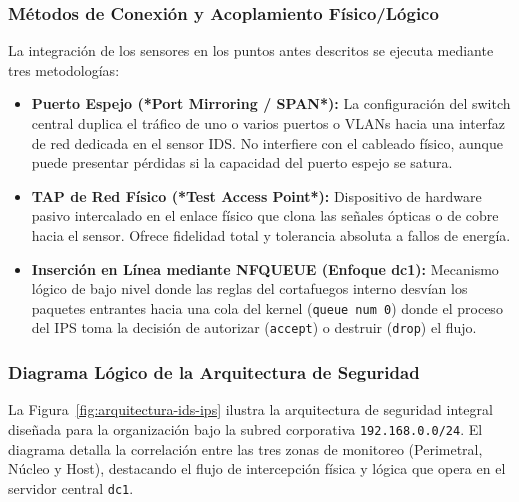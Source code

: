 \subsubsection{Métodos de Conexión y Acoplamiento Físico/Lógico}

La integración de los sensores en los puntos antes descritos se ejecuta mediante tres metodologías:

\begin{itemize}
  \item \textbf{Puerto Espejo (*Port Mirroring / SPAN*):} La configuración del switch central duplica el tráfico de uno o varios puertos o VLANs hacia una interfaz de red dedicada en el sensor IDS. No interfiere con el cableado físico, aunque puede presentar pérdidas si la capacidad del puerto espejo se satura.
  \item \textbf{TAP de Red Físico (*Test Access Point*):} Dispositivo de hardware pasivo intercalado en el enlace físico que clona las señales ópticas o de cobre hacia el sensor. Ofrece fidelidad total y tolerancia absoluta a fallos de energía.
  \item \textbf{Inserción en Línea mediante NFQUEUE (Enfoque dc1):} Mecanismo lógico de bajo nivel donde las reglas del cortafuegos interno desvían los paquetes entrantes hacia una cola del kernel (\texttt{queue num 0}) donde el proceso del IPS toma la decisión de autorizar (\texttt{accept}) o destruir (\texttt{drop}) el flujo.
\end{itemize}

\subsubsection{Diagrama Lógico de la Arquitectura de Seguridad}

La Figura~\ref{fig:arquitectura-ids-ips} ilustra la arquitectura de seguridad integral diseñada para la organización bajo la subred corporativa \texttt{192.168.0.0/24}. El diagrama detalla la correlación entre las tres zonas de monitoreo (Perimetral, Núcleo y Host), destacando el flujo de intercepción física y lógica que opera en el servidor central \texttt{dc1}.

